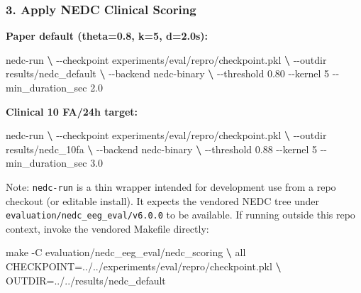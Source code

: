 \documentclass[
]{article}
\newenvironment{Shaded}{}{}
\newcommand{\ExtensionTok}[1]{#1}
\newcommand{\FunctionTok}[1]{\textcolor[rgb]{0.02,0.16,0.49}{#1}}
\newcommand{\KeywordTok}[1]{\textcolor[rgb]{0.00,0.44,0.13}{\textbf{#1}}}
\newcommand{\NormalTok}[1]{#1}
\newcommand{\VariableTok}[1]{\textcolor[rgb]{0.10,0.09,0.49}{#1}}
\begin{document}
\hypertarget{apply-nedc-clinical-scoring}{%
\subsubsection{3. Apply NEDC Clinical
Scoring}\label{apply-nedc-clinical-scoring}}

\textbf{Paper default (theta=0.8, k=5, d=2.0s):}

\begin{Shaded}
\begin{Highlighting}[]
\ExtensionTok{nedc{-}run} \KeywordTok{\textbackslash{}}
  \ExtensionTok{{-}{-}checkpoint}\NormalTok{ experiments/eval/repro/checkpoint.pkl }\KeywordTok{\textbackslash{}}
  \ExtensionTok{{-}{-}outdir}\NormalTok{ results/nedc\_default }\KeywordTok{\textbackslash{}}
  \ExtensionTok{{-}{-}backend}\NormalTok{ nedc{-}binary }\KeywordTok{\textbackslash{}}
  \ExtensionTok{{-}{-}threshold}\NormalTok{ 0.80 {-}{-}kernel 5 {-}{-}min\_duration\_sec 2.0}
\end{Highlighting}
\end{Shaded}

\textbf{Clinical 10 FA/24h target:}

\begin{Shaded}
\begin{Highlighting}[]
\ExtensionTok{nedc{-}run} \KeywordTok{\textbackslash{}}
  \ExtensionTok{{-}{-}checkpoint}\NormalTok{ experiments/eval/repro/checkpoint.pkl }\KeywordTok{\textbackslash{}}
  \ExtensionTok{{-}{-}outdir}\NormalTok{ results/nedc\_10fa }\KeywordTok{\textbackslash{}}
  \ExtensionTok{{-}{-}backend}\NormalTok{ nedc{-}binary }\KeywordTok{\textbackslash{}}
  \ExtensionTok{{-}{-}threshold}\NormalTok{ 0.88 {-}{-}kernel 5 {-}{-}min\_duration\_sec 3.0}
\end{Highlighting}
\end{Shaded}

Note: \texttt{nedc-run} is a thin wrapper intended for development use
from a repo checkout (or editable install). It expects the vendored NEDC
tree under \texttt{evaluation/nedc\_eeg\_eval/v6.0.0} to be available.
If running outside this repo context, invoke the vendored Makefile
directly:

\begin{Shaded}
\begin{Highlighting}[]
\FunctionTok{make}\NormalTok{ {-}C evaluation/nedc\_eeg\_eval/nedc\_scoring }\KeywordTok{\textbackslash{}}
  \ExtensionTok{all}\NormalTok{ CHECKPOINT=../../experiments/eval/repro/checkpoint.pkl }\KeywordTok{\textbackslash{}}
  \VariableTok{OUTDIR=}\NormalTok{../../results/nedc\_default}
\end{Highlighting}
\end{Shaded}
\end{document}
